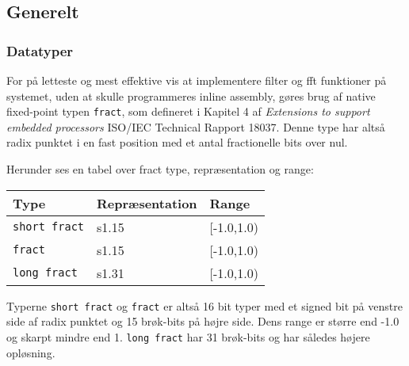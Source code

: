 \subsection{Generelt}

\subsubsection{Datatyper}
For på letteste og mest effektive vis at implementere filter og fft funktioner på systemet, uden at skulle programmeres inline assembly, gøres brug af native fixed-point typen \verb+fract+, som defineret i Kapitel 4 af \textit{Extensions to support embedded processors} ISO/IEC Technical Rapport 18037. 
Denne type har altså radix punktet i en fast position med et antal fractionelle bits over nul. 

Herunder ses en tabel over fract type, repræsentation og range:

\begin{center}
    \begin{tabular}{ | p{} | p{} | p{} |}
    \hline
    \textbf{Type}				& \textbf{Repræsentation}	& \textbf{Range}	\\ \hline
    \verb+short fract+ 			& s1.15						& [-1.0,1.0)		\\ \hline
    \verb+fract+ 				& s1.15						& [-1.0,1.0)		\\ \hline
    \verb+long fract+ 			& s1.31						& [-1.0,1.0)		\\ \hline
    \end{tabular}
\end{center}

Typerne \verb+short fract+ og \verb+fract+ er altså 16 bit typer med et signed bit på venstre side af radix punktet og 15 brøk-bits på højre side. Dens range er større end -1.0 og skarpt mindre end 1. \verb+long fract+ har 31 brøk-bits og har således højere opløsning.
